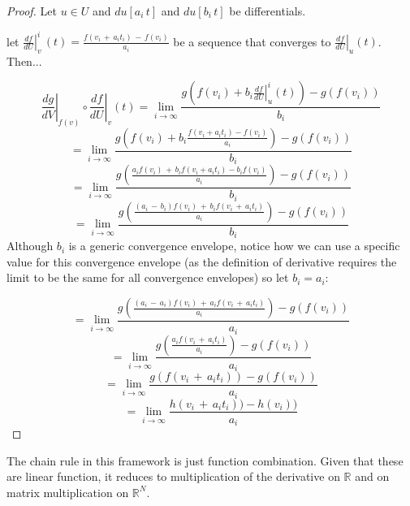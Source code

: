 \documentclass[11pt,letterpaper,fleqn]{memoir}
\begin{document}
\begin{proof}

Let $u \in U$ and $du[a_{i}\, t]$ and $du[b_{i}\,t]$ be differentials.

let $\left.\frac{df}{dU}\right|_{v}^{i}\,(t) = \frac{f(v_{i}\,+\,a_{i} t_{i})\,-\,f(v_{i})}{a_{i}}$ be a sequence that converges to $\left.\frac{df}{dU}\right|_{u}(t)$. Then...

$$
\left.\frac{dg}{dV}\right|_{f(v)} \circ \left.\frac{df}{dU}\right|_{v} (t) = \lim_{ i \to \infty } \frac{g\left( f(v_{i}) + b_{i}\left.\frac{df}{dU}\right|_{u}^{i}(t) \right) - g(f(v_{i}))}{b_{i}} 
$$
$$
= \lim_{i \to \infty} \frac{g(f(v_{i}) + b_{i}\frac{f(v_{i} + a_{i}t_{i}) - f(v_{i})}{a_{i}}) - g(f(v_{i}))}{b_{i}} 
$$
$$
= \lim_{i \to \infty} \frac{g(\frac{a_{i}f(v_{i})\,+\,b_{i}f(v_{i}+a_{i}t_{i}) - b_{i}f(v_{i})}{a_{i}}) - g(f(v_{i}))}{b_{i}} 
$$
$$
= \lim_{i \to \infty} \frac{g(\frac{(a_{i}\,-\,b_{i})f(v_{i})\,+\,b_{i}f(v_{i}\,+\,a_{i}t_{i})}{a_{i}}) - g(f(v_{i}))}{b_{i}} 
$$
Although $b_{i}$ is a generic convergence envelope, notice how we can use a specific value for this convergence envelope (as the definition of derivative requires the limit to be the same for all convergence envelopes) so let $b_{i} = a_{i}$:

$$
= \lim_{i \to \infty} \frac{g(\frac{(a_{i}\,-\,a_{i})f(v_{i})\,+\,a_{i}f(v_{i}\,+\,a_{i}t_{i})}{a_{i}}) - g(f(v_{i}))}{a_{i}} 
$$
$$
= \lim_{i \to \infty} \frac{g(\frac{a_{i}f(v_{i}\,+\,a_{i}t_{i})}{a_{i}}) - g(f(v_{i}))}{a_{i}} 
$$
$$
= \lim_{i \to \infty} \frac{g(f(v_{i}\,+\,a_{i}t_{i})) - g(f(v_{i}))}{a_{i}} 
$$
$$
= \lim_{i \to \infty} \frac{h(v_{i}\,+\,a_{i}t_{i})) - h(v_{i}))}{a_{i}} 
$$

\end{proof}

\begin{remark}
	The chain rule in this framework is just function combination. Given that these are linear function, it reduces to multiplication of the derivative on $\mathbb{R}$ and on matrix multiplication on $\mathbb{R}^N$.
\end{remark}
\end{document}
